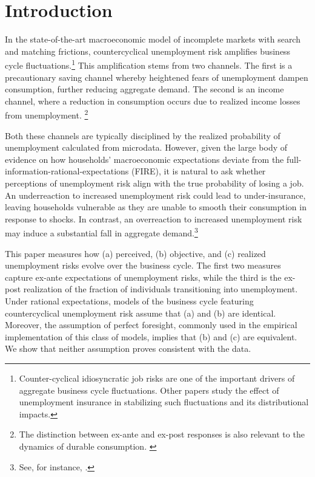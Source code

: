 
\section{Introduction}
In the state-of-the-art macroeconomic model of incomplete markets with search and matching frictions, countercyclical unemployment risk amplifies business cycle fluctuations.\footnote{Counter-cyclical idiosyncratic job risks are one of the important drivers of aggregate business cycle fluctuations\citep{bayer2019precautionary,den2018unemployment,broer2021unemployment, graves2020does}. Other papers study the effect of unemployment insurance in stabilizing such fluctuations and its distributional impacts\citep{mckay2021optimal,boone2021unemployment,kekre2023unemployment}.} This amplification stems from two channels. The first is a precautionary saving channel whereby heightened fears of unemployment dampen consumption, further reducing aggregate demand. The second is an income channel, where a reduction in consumption occurs due to realized income losses from unemployment. \footnote{The distinction between ex-ante and ex-post responses is also relevant to the dynamics of durable consumption. \citep{harmenberg2021consumption}}


Both these channels are typically disciplined by the realized probability of unemployment calculated from microdata. However, given the large body of evidence on how households' macroeconomic expectations deviate from the full-information-rational-expectations (FIRE), it is natural to ask whether perceptions of unemployment risk align with the true probability of losing a job. An underreaction to increased unemployment risk could lead to under-insurance, leaving households vulnerable as they are unable to smooth their consumption in response to shocks. In contrast, an overreaction to increased unemployment risk may induce a substantial fall in aggregate demand.\footnote{See, for instance, \cite{den2018unemployment}.} 

 This paper measures how (a) perceived, (b) objective, and (c) realized unemployment risks evolve over the business cycle. The first two measures capture ex-ante expectations of unemployment risks, while the third is the ex-post realization of the fraction of individuals transitioning into unemployment. Under rational expectations, models of the business cycle featuring countercyclical unemployment risk assume that (a) and (b) are identical. Moreover, the assumption of perfect foresight, commonly used in the empirical implementation of this class of models, implies that (b) and (c) are equivalent. We show that neither assumption proves consistent with the data.




